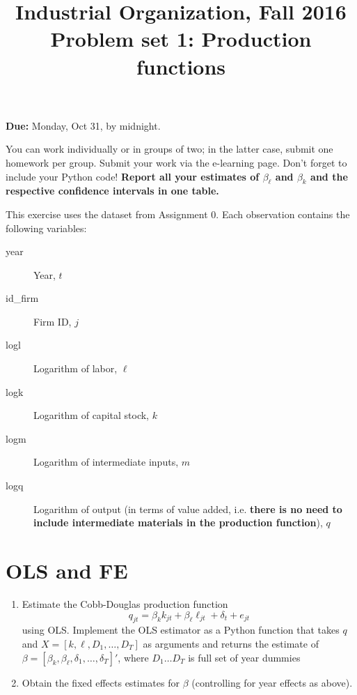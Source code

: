 \documentclass[a4paper, 11pt]{article}
\title{Industrial Organization, Fall 2016\\
Problem set 1: Production functions}
\date{}
\newcommand{\be}{\begin{equation*}}
\newcommand{\ee}{\end{equation*}}
\begin{document}
\maketitle

\textbf{Due:} Monday, Oct 31, by midnight.\\\medskip

You can work individually or in groups of two; in the latter case, submit one homework per group. Submit your work via the e-learning page. Don't forget to include your Python code! \textbf{Report all your estimates of $\beta_\ell$ and $\beta_k$ and the respective confidence intervals in one table.}\medskip

This exercise uses the dataset from Assignment 0. Each observation contains the following variables:
\begin{description}
	\item[year] Year, $t$
	\item[id\_firm] Firm ID, $j$
	\item[logl] Logarithm of labor, $\ell$
	\item[logk] Logarithm of capital stock, $k$
	\item[logm] Logarithm of intermediate inputs, $m$
	\item[logq] Logarithm of output (in terms of value added, i.e. \textbf{there is no need to include intermediate materials in the production function}), $q$
\end{description}

\section{OLS and FE}	

\begin{enumerate}
\item{Estimate the Cobb-Douglas production function
	\be
		q_{jt} = \beta_kk_{jt} + \beta_\ell\ell_{jt} + \delta_t + e_{jt}
	\ee
	using OLS. Implement the OLS estimator as a Python function that takes $q$ and $X = [k, \ell, D_1, \dots, D_{T}]$ as arguments and returns the estimate of $\beta = [\beta_k, \beta_\ell, \delta_1, \dots, \delta_{T}]'$, where $D_1\dots{}D_{T}$ is full set of year dummies}
	
\item{Obtain the fixed effects estimates for $\beta$ (controlling for year effects as above).}


\end{enumerate}
\end{document}
